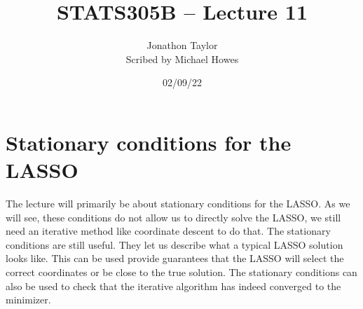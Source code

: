 




\title{STATS305B -- Lecture 11}
\author{Jonathon Taylor\\ Scribed by Michael Howes}
\date{02/09/22}

\pagestyle{fancy}
\fancyhf{}


\maketitle
\tableofcontents
\section{Stationary conditions for the LASSO}
The lecture will primarily be about stationary conditions for the LASSO. As we will see, these conditions do not allow us to directly solve the LASSO, we still need an iterative method like coordinate descent to do that. The stationary conditions are still useful. They let us describe what a typical LASSO solution looks like. This can be used provide guarantees that the LASSO will select the correct coordinates or be close to the true solution. The stationary conditions can also be used to check that the iterative algorithm has indeed converged to the minimizer.
